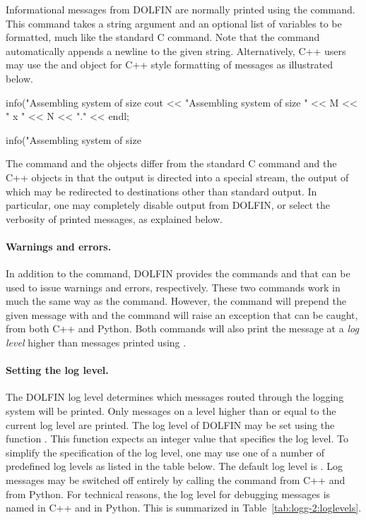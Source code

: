 Informational messages from DOLFIN are normally printed using the
 command. This command takes a string argument and an
optional list of variables to be formatted, much like the standard
C  command. Note that the  command
automatically appends a newline to the given string. Alternatively,
C++ users may use the  and  object
for C++ style formatting of messages as illustrated below.
\begin{c++}
info("Assembling system of size %
cout << "Assembling system of size " << M << " x " << N << "." << endl;
\end{c++}
\begin{python}
info("Assembling system of size %
\end{python}
The  command and the  objects differ
from the standard C  command and the C++
 objects in that the output is directed into a
special stream, the output of which may be redirected to destinations
other than standard output. In particular, one may completely disable
output from DOLFIN, or select the verbosity of printed messages, as
explained below.

\paragraph{Warnings and errors.}

In addition to the  command, DOLFIN provides the
commands  and  that can be used to issue
warnings and errors, respectively. These two commands work in much the
same way as the  command. However, the  command
will prepend the given message with  and the
 command will raise an exception that can be caught, from
both C++ and Python. Both commands will also print the message at a
\emph{log level} higher than messages printed using .

\paragraph{Setting the log level.}

The DOLFIN log level determines which messages routed through the
logging system will be printed. Only messages on a level higher than
or equal to the current log level are printed. The log level of DOLFIN
may be set using the function . This function
expects an integer value that specifies the log level. To simplify the
specification of the log level, one may use one of a number of
predefined log levels as listed in the table below. The default log
level is . Log messages may be switched off entirely by
calling the command  from C++ and
 from Python. For technical reasons, the
log level for debugging messages is named  in C++ and
 in Python. This is summarized in
Table~\ref{tab:logg-2:loglevels}.

